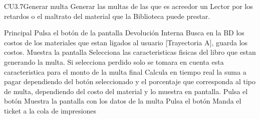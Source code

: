 
	\begin{UseCase}{CU3.7}{Generar multa}{
		Generar las multas de las que es acreedor un Lector por los retardos o el maltrato del material que la Biblioteca puede prestar.
	}
	\end{UseCase}
	\begin{UCtrayectoria}{Principal}
		\UCpaso[\UCactor]Pulsa el botón  de la pantalla Devolución Interna
		\UCpaso[\UCsist]Busca en la BD los costos de los materiales que estan ligados al usuario [Trayectoria A], guarda los costos.
		\UCpaso[\UCsist]Muestra la pantalla 
		\UCpaso[\UCactor]Selecciona las caracteristicas fisicas del libro que estan generando la multa.
		\UCpaso[\UCsist]Si selecciona perdido solo se tomara en cuenta esta caracteristica para el monto de la multa final
		\UCpaso[\UCsist]Calcula en tiempo real la suma a pagar dependiendo del botón seleccionado y el porcentaje que corresponda al tipo de multa, dependiendo del costo del material y lo muestra en pantalla.
		\UCpaso[\UCactor]Pulsa el botón  
		\UCpaso[\UCsist]Muestra la pantalla  con los datos de la multa
		\UCpaso[\UCactor]Pulsa el botón 
		\UCpaso[\UCsist]Manda el ticket a la cola de impresiones 
	\end{UCtrayectoria}
			

